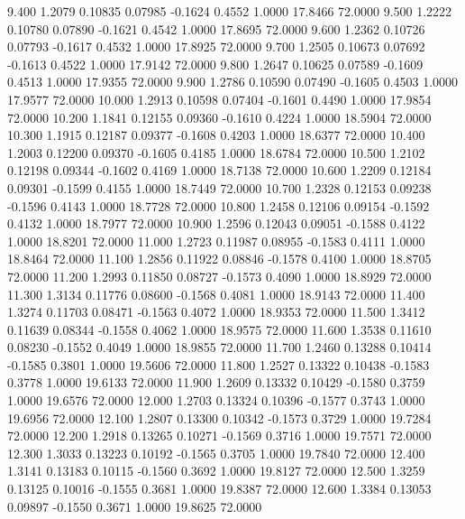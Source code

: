    9.400   1.2079   0.10835   0.07985  -0.1624   0.4552   1.0000  17.8466  72.0000
   9.500   1.2222   0.10780   0.07890  -0.1621   0.4542   1.0000  17.8695  72.0000
   9.600   1.2362   0.10726   0.07793  -0.1617   0.4532   1.0000  17.8925  72.0000
   9.700   1.2505   0.10673   0.07692  -0.1613   0.4522   1.0000  17.9142  72.0000
   9.800   1.2647   0.10625   0.07589  -0.1609   0.4513   1.0000  17.9355  72.0000
   9.900   1.2786   0.10590   0.07490  -0.1605   0.4503   1.0000  17.9577  72.0000
  10.000   1.2913   0.10598   0.07404  -0.1601   0.4490   1.0000  17.9854  72.0000
  10.200   1.1841   0.12155   0.09360  -0.1610   0.4224   1.0000  18.5904  72.0000
  10.300   1.1915   0.12187   0.09377  -0.1608   0.4203   1.0000  18.6377  72.0000
  10.400   1.2003   0.12200   0.09370  -0.1605   0.4185   1.0000  18.6784  72.0000
  10.500   1.2102   0.12198   0.09344  -0.1602   0.4169   1.0000  18.7138  72.0000
  10.600   1.2209   0.12184   0.09301  -0.1599   0.4155   1.0000  18.7449  72.0000
  10.700   1.2328   0.12153   0.09238  -0.1596   0.4143   1.0000  18.7728  72.0000
  10.800   1.2458   0.12106   0.09154  -0.1592   0.4132   1.0000  18.7977  72.0000
  10.900   1.2596   0.12043   0.09051  -0.1588   0.4122   1.0000  18.8201  72.0000
  11.000   1.2723   0.11987   0.08955  -0.1583   0.4111   1.0000  18.8464  72.0000
  11.100   1.2856   0.11922   0.08846  -0.1578   0.4100   1.0000  18.8705  72.0000
  11.200   1.2993   0.11850   0.08727  -0.1573   0.4090   1.0000  18.8929  72.0000
  11.300   1.3134   0.11776   0.08600  -0.1568   0.4081   1.0000  18.9143  72.0000
  11.400   1.3274   0.11703   0.08471  -0.1563   0.4072   1.0000  18.9353  72.0000
  11.500   1.3412   0.11639   0.08344  -0.1558   0.4062   1.0000  18.9575  72.0000
  11.600   1.3538   0.11610   0.08230  -0.1552   0.4049   1.0000  18.9855  72.0000
  11.700   1.2460   0.13288   0.10414  -0.1585   0.3801   1.0000  19.5606  72.0000
  11.800   1.2527   0.13322   0.10438  -0.1583   0.3778   1.0000  19.6133  72.0000
  11.900   1.2609   0.13332   0.10429  -0.1580   0.3759   1.0000  19.6576  72.0000
  12.000   1.2703   0.13324   0.10396  -0.1577   0.3743   1.0000  19.6956  72.0000
  12.100   1.2807   0.13300   0.10342  -0.1573   0.3729   1.0000  19.7284  72.0000
  12.200   1.2918   0.13265   0.10271  -0.1569   0.3716   1.0000  19.7571  72.0000
  12.300   1.3033   0.13223   0.10192  -0.1565   0.3705   1.0000  19.7840  72.0000
  12.400   1.3141   0.13183   0.10115  -0.1560   0.3692   1.0000  19.8127  72.0000
  12.500   1.3259   0.13125   0.10016  -0.1555   0.3681   1.0000  19.8387  72.0000
  12.600   1.3384   0.13053   0.09897  -0.1550   0.3671   1.0000  19.8625  72.0000
